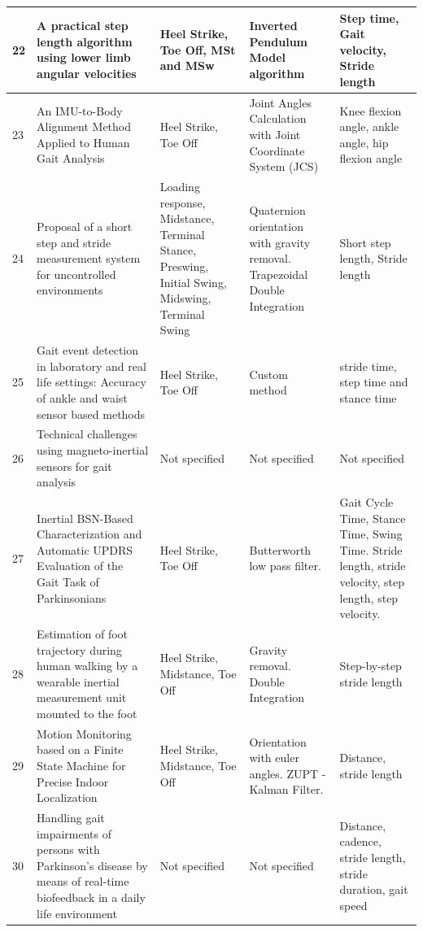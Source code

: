 {\begin{longtable}{|p{1cm}|p{4cm}|p{2.5cm}|p{3.5cm}|p{6cm}|}
22 & A practical step length algorithm using lower limb angular velocities & Heel Strike, Toe Off, MSt and MSw & Inverted Pendulum Model algorithm & Step time, Gait velocity, Stride length \\ \hline
23 & An IMU-to-Body Alignment Method Applied to Human Gait Analysis & Heel Strike, Toe Off & Joint Angles Calculation with Joint Coordinate System (JCS) & Knee flexion angle, ankle angle, hip flexion angle \\ \hline
24 & Proposal of a short step and stride measurement system for uncontrolled environments & Loading response, Midstance, Terminal Stance, Preswing, Initial Swing, Midswing, Terminal Swing & Quaternion orientation with gravity removal.
Trapezoidal Double Integration & Short step length, Stride length \\ \hline
25 & Gait event detection in laboratory and real life settings: Accuracy of ankle and waist sensor based methods & Heel Strike, Toe Off & Custom method & stride time, step time and stance time \\ \hline
26 & Technical challenges using magneto-inertial sensors for gait analysis & Not specified & Not specified & Not specified \\ \hline
27 & Inertial BSN-Based Characterization and Automatic UPDRS Evaluation of the Gait Task of Parkinsonians & Heel Strike, Toe Off & Butterworth low pass filter. & Gait Cycle Time, Stance Time, Swing Time.
Stride length, stride velocity, step length, step velocity. \\ \hline
28 & Estimation of foot trajectory during human walking by a wearable inertial measurement unit mounted to the foot & Heel Strike, Midstance, Toe Off & Gravity removal. Double Integration & Step-by-step stride length \\ \hline
29 & Motion Monitoring based on a Finite State Machine for Precise Indoor Localization & Heel Strike, Midstance, Toe Off & Orientation with euler angles. ZUPT - Kalman Filter. & Distance, stride length \\ \hline
30 & Handling gait impairments of persons with Parkinson’s disease by means of real-time biofeedback in a daily life environment & Not specified & Not specified & Distance, cadence, stride length, stride duration, gait speed \\ \hline
\end{longtable}
\normalsize}



